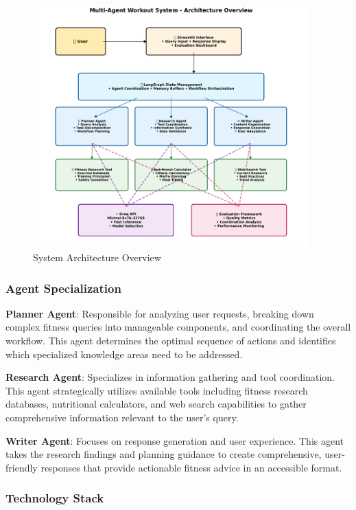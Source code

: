 \documentclass[conference]{IEEEtran}
\begin{document}
\begin{figure}[htbp]
\centering
\includegraphics[width=0.95\textwidth]{diagrams/system_architecture.png}
\caption{System Architecture Overview}
\label{fig:architecture}
\end{figure}

\subsubsection{Agent Specialization}

\textbf{Planner Agent}: Responsible for analyzing user requests, breaking down complex fitness queries into manageable components, and coordinating the overall workflow. This agent determines the optimal sequence of actions and identifies which specialized knowledge areas need to be addressed.

\textbf{Research Agent}: Specializes in information gathering and tool coordination. This agent strategically utilizes available tools including fitness research databases, nutritional calculators, and web search capabilities to gather comprehensive information relevant to the user's query.

\textbf{Writer Agent}: Focuses on response generation and user experience. This agent takes the research findings and planning guidance to create comprehensive, user-friendly responses that provide actionable fitness advice in an accessible format.

\subsubsection{Technology Stack}
\end{document}
